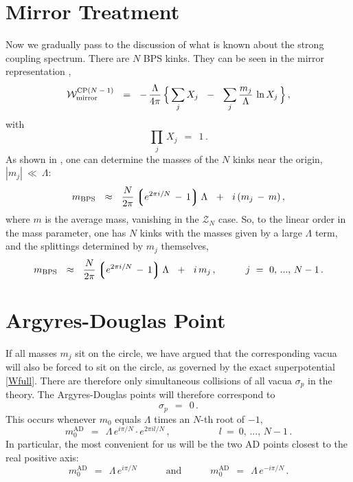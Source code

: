 \documentclass[epsfig,12pt]{article}
\def\beq{\begin{equation}}
\def\eeq{\end{equation}}
\def\beq{\begin{equation}}
\def\eeq{\end{equation}}
\newcommand{\mc}[1]{\mathcal{#1}}
\newcommand{\lgr}{\left\lgroup}
\newcommand{\rgr}{\right\rgroup}
\newcommand{\mbps}{m_\text{BPS}}
\newcommand{\W}{\mathcal{W}}
\begin{document}
\section{Mirror Treatment}

	Now we gradually pass to the discussion of what is known 
	about the strong coupling spectrum.
	There are $ N $ BPS kinks.
	They can be seen in the mirror representation \cite{MR1}, 
\beq
\label{mirror}
	\W_\text{mirror}^\text{CP($N-1$)} ~~=~~
		-\, \frac{\Lambda}{4\pi}\, 
		\Bigl\{\, \sum_j X_j ~~-~~ \sum_j \frac{m_j}{\Lambda}\, \ln X_j \,\Bigr\}\,,
\eeq
	with
\beq
	\prod_j\, X_j ~~=~~ 1\,.
\eeq
	As shown in \cite{Shifman:2010id}, one can determine the masses of the $ N $ kinks
	near the origin, $ | m_j | ~\ll~ \Lambda $:
\beq
\label{mirrorm}
	\mbps ~~\approx~~ \frac{N}{2\pi} \lgr e^{2\pi i / N} \,-\, 1 \rgr \Lambda
			   ~~+~~ i\, ( m_j \,-\, m )\,,
\eeq
	where $ m $ is the average mass, vanishing in the $ \mc{Z}_N $ case.
	So, to the linear order in the mass parameter, one has $ N $ kinks with the masses given
	by a large $ \Lambda $ term, and the splittings determined by $ m_j $ themselves,
\beq
\label{smirror}
	\mbps ~~\approx~~\frac{N}{2\pi} \lgr e^{2\pi i / N} \,-\, 1 \rgr \Lambda
			   ~~+~~ i\, m_j\,,
	\qquad\quad j~=~ 0,\,...,\, N-1\,.
\eeq

\section{Argyres-Douglas Point}

	If all masses $ m_j $ sit on the circle, we have argued that the corresponding
	vacua will also be forced to sit on the circle, as governed by the exact superpotential
	\eqref{Wfull}.
	There are therefore only simultaneous collisions of all vacua $ \sigma_p $
	in the theory.
	The Argyres-Douglas points \cite{AD} will therefore correspond to 
\beq
	\sigma_p ~~=~~ 0\,.
\eeq
	This occurs whenever $ m_0 $ equals $ \Lambda $ times an $N$-th root of $ -1 $,
\beq
	m_0^\text{AD} ~~=~~ \Lambda \, e^{i \pi / N} \cdot e^{2\pi i l / N}\,,
	\qquad\qquad\quad 
	l ~=~ 0,\,...,\, N-1 \,.
\eeq
	In particular, the most convenient for us will be the two AD points closest to the
	real positive axis:
\beq
	m_0^\text{AD} ~~=~~ \Lambda \, e^{i \pi / N}
	\qquad\quad
	\text{and}
	\qquad\quad
	m_0^\text{AD} ~~=~~ \Lambda \, e^{- i \pi / N}\,.
\eeq
\end{document}
